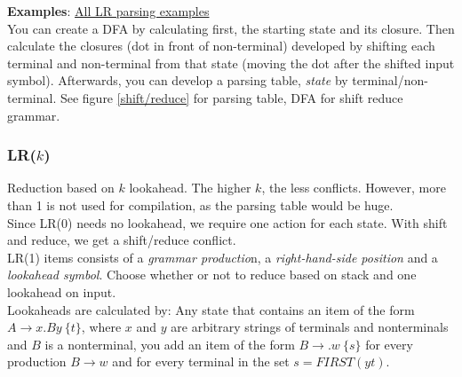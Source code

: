 \textbf{Examples}: \href{https://users-cs.au.dk/~askarov/dovs/lr/}{All LR parsing examples}\\

You can create a DFA by calculating first, the starting state and its closure. Then calculate the closures (dot in front of non-terminal) developed by shifting each terminal and non-terminal from that state (moving the dot after the shifted input symbol). Afterwards, you can develop a parsing table, \textit{state} by terminal/non-terminal. See figure \ref{shift/reduce} for parsing table, DFA for shift reduce grammar.

\subsubsection{LR($k$)}

Reduction based on $k$ lookahead. The higher $k$, the less conflicts. However, more than 1 is not used for compilation, as the parsing table would be huge.\\

Since LR(0) needs no lookahead, we require one action for each state. With shift and reduce, we get a shift/reduce conflict.\\

LR(1) items consists of a \textit{grammar productio}n, a \textit{right-hand-side position} and a \textit{lookahead symbol}. Choose whether or not to reduce based on stack and one lookahead on input.\\

Lookaheads are calculated by: Any state that contains an item of the form $A \rightarrow x.By\ \{t\}$, where $x$ and $y$ are arbitrary strings of terminals and nonterminals and $B$ is a nonterminal, you add an item of the form $B \rightarrow .w\ \{s\}$ for every production $B \rightarrow w$ and for every terminal in the set $s = FIRST(yt)$.



